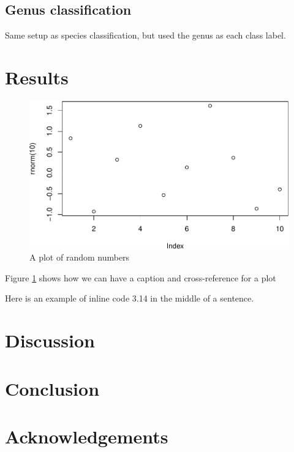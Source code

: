 \documentclass[
]{article}
\begin{document}
\hypertarget{genus-classification}{%
\subsection{Genus classification}\label{genus-classification}}

Same setup as species classification, but used the genus as each class label.

\hypertarget{results}{%
\section{Results}\label{results}}

\begin{figure}
\centering
\includegraphics{../figures/demo-plot-1.pdf}
\caption{\label{fig:demo-plot}A plot of random numbers}
\end{figure}

Figure \ref{fig:demo-plot} shows how we can have a caption and cross-reference for a plot

Here is an example of inline code 3.14 in the middle of a sentence.

\hypertarget{discussion}{%
\section{Discussion}\label{discussion}}

\hypertarget{conclusion}{%
\section{Conclusion}\label{conclusion}}

\hypertarget{acknowledgements}{%
\section{Acknowledgements}\label{acknowledgements}}
\end{document}
